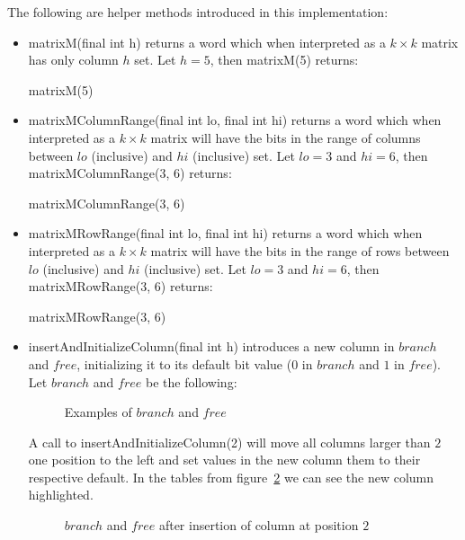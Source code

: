 The following are helper methods introduced in this implementation:
\begin{itemize}
    \item
    {\ttfamily matrixM(final int h)} returns a word which when interpreted as a $k \times k$ matrix has only column $h$ set. Let $h = 5$, then {\ttfamily matrixM(5)} returns:
    \begin{table}[H]
    \centering
    
    \caption{{\ttfamily matrixM(5)}}
    \label{tab:matrixM}
    \end{table}
    
    \item
    {\ttfamily matrixMColumnRange(final int lo, final int hi)} returns a word which when interpreted as a $k \times k$ matrix will have the bits in the range of columns between $lo$ (inclusive) and $hi$ (inclusive) set. Let $lo = 3$ and $hi = 6$, then {\ttfamily matrixMColumnRange(3, 6)} returns:
    \begin{table}[H]
    \centering
    
    \caption{{\ttfamily matrixMColumnRange(3, 6)}}
    \label{tab:MatrixColumnRange}
    \end{table}
    
    \item
    {\ttfamily matrixMRowRange(final int lo, final int hi)} returns a word which when interpreted as a $k \times k$ matrix will have the bits in the range of rows between $lo$ (inclusive) and $hi$ (inclusive) set. Let $lo = 3$ and $hi = 6$, then {\ttfamily matrixMRowRange(3, 6)} returns:
    \begin{table}[H]
    \centering
    
    \caption{{\ttfamily matrixMRowRange(3, 6)}}
    \label{tab:MatrixRowRange}
    \end{table}
    
    \item
    {\ttfamily insertAndInitializeColumn(final int h)} introduces a new column in $branch$ and $free$, initializing it to its default bit value ($0$ in $branch$ and $1$ in $free$).
    Let $branch$ and $free$ be the following:
    \begin{figure}[H]
    \centering
    
    \caption{Examples of $branch$ and $free$}
    \label{fig:branchAndFreeExample}
    \end{figure}
    A call to {\ttfamily insertAndInitializeColumn(2)} will move all columns larger than $2$ one position to the left and set values in the new column them to their respective default. In the tables from figure~\ref{fig:branchAndFreeAfterColumnInsertion} we can see the new column highlighted.
    \begin{figure}[H]
    \centering
    
    \caption[Example of $branch$ and $free$ after insertion of column at position $2$]{$branch$ and $free$ after insertion of column at position $2$}
    \label{fig:branchAndFreeAfterColumnInsertion}
    \end{figure}
    

\end{itemize}
